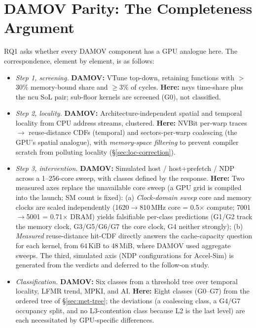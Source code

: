 \section{DAMOV Parity: The Completeness Argument}
\label{sec:met-parity}

RQ1 asks whether every DAMOV component has a GPU analogue here. The correspondence, element by element, is as follows:

\begin{itemize}
    \item \emph{Step 1, screening.} \textbf{DAMOV:} VTune top-down, retaining functions with $>$30\% memory-bound share and $\geq$3\% of cycles. \textbf{Here:} nsys time-share plus the ncu SoL pair; sub-floor kernels are screened (G0), not classified.

    \item \emph{Step 2, locality.} \textbf{DAMOV:} Architecture-independent spatial and temporal locality from CPU address streams, clustered. \textbf{Here:} NVBit per-warp traces $\rightarrow$ reuse-distance CDFs (temporal) and sectors-per-warp coalescing (the GPU's spatial analogue), with \emph{memory-space filtering} to prevent compiler scratch from polluting locality (\S\ref{sec:loc-correction}).

    \item \emph{Step 3, intervention.} \textbf{DAMOV:} Simulated host / host+prefetch / NDP across a 1--256-core sweep, with classes defined by the response. \textbf{Here:} Two measured axes replace the unavailable core sweep (a GPU grid is compiled into the launch; SM count is fixed): (a) \emph{Clock-domain sweep} core and memory clocks are scaled independently (1620$\rightarrow$810\,MHz core = 0.5$\times$ compute; 7001$\rightarrow$5001 = 0.71$\times$ DRAM) yields falsifiable per-class predictions (G1/G2 track the memory clock, G3/G5/G6/G7 the core clock, G4 neither strongly); (b) \emph{Measured} reuse-distance hit-CDF directly answers the cache-capacity question for each kernel, from 64\,KiB to 48\,MiB, where DAMOV used aggregate sweeps. The third, simulated axis (NDP configurations for Accel-Sim) is generated from the verdicts and deferred to the follow-on study.

    \item \emph{Classification.} \textbf{DAMOV:} Six classes from a threshold tree over temporal locality, LFMR trend, MPKI, and AI. \textbf{Here:} Eight classes (G0--G7) from the ordered tree of \S\ref{sec:met-tree}; the deviations (a coalescing class, a G4/G7 occupancy split, and no L3-contention class because L2 is the last level) are each necessitated by GPU-specific differences.


\end{itemize}
